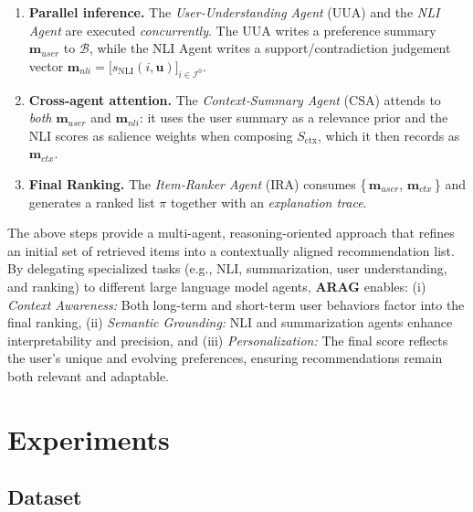 \documentclass[sigconf]{acmart}
\begin{document}
\begin{enumerate}
    \item \textbf{Parallel inference.}  
    The \emph{User‑Understanding Agent} (UUA) and the \emph{NLI Agent} are executed \emph{concurrently}.  
    The UUA writes a preference summary $\mathbf{m}_{\textit{user}}$ to $\mathcal{B}$, while the NLI Agent
    writes a support/contradiction judgement vector 
    $\mathbf{m}_{\textit{nli}} = \bigl[s_{\mathrm{NLI}}(i,\mathbf{u})\bigr]_{i\in\mathcal{I}^0}$.

    \item \textbf{Cross‑agent attention.}  
    The \emph{Context‑Summary Agent} (CSA) attends to \emph{both}
    $\mathbf{m}_{\textit{user}}$ and $\mathbf{m}_{\textit{nli}}$:  
    it uses the user summary as a relevance prior and the NLI scores as salience weights
    when composing $S_{\mathrm{ctx}}$, which it then records as $\mathbf{m}_{\textit{ctx}}$.

    \item \textbf{Final Ranking.}  
    The \emph{Item‑Ranker Agent} (IRA) consumes \{\,$\mathbf{m}_{\textit{user}}$, $\mathbf{m}_{\textit{ctx}}$\,\}
    and generates a ranked list $\pi$ together with an
    \emph{explanation trace}.  
\end{enumerate}


The above steps provide a multi-agent, reasoning-oriented approach that refines an initial set of retrieved items into a contextually aligned recommendation list. By delegating specialized tasks (e.g., NLI, summarization, user understanding, and ranking) to different large language model agents, \textbf{ARAG} enables: (i) \textit{Context Awareness:} Both long-term and short-term user behaviors factor into the final ranking, (ii) \textit{Semantic Grounding:} NLI and summarization agents enhance interpretability and precision, and (iii) \textit{Personalization:} The final score reflects the user’s unique and evolving preferences, ensuring recommendations remain both relevant and adaptable. 



\section{Experiments}
\subsection{Dataset}
\end{document}

